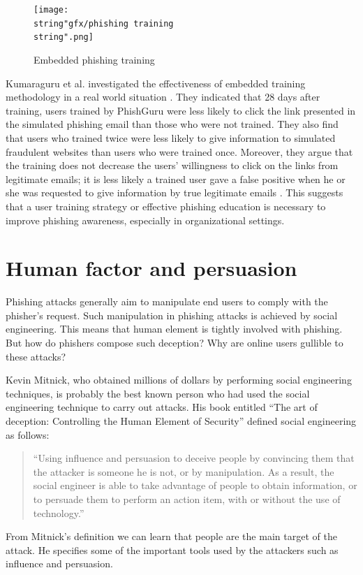 \begin{figure}[H]
\centering{}\texttt{[image: \\string"gfx/phishing training\\string".png]}\protect\caption{\label{fig:em-training}Embedded phishing training \citep{kumaraguru:2009}}
\end{figure}


Kumaraguru et al. investigated the effectiveness of embedded training
methodology in a real world situation \citep{kumaraguru:2009}. They
indicated that 28 days after training, users trained by PhishGuru
were less likely to click the link presented in the simulated phishing
email than those who were not trained. They also find that users who
trained twice were less likely to give information to simulated fraudulent
websites than users who were trained once. Moreover, they argue that
the training does not decrease the users' willingness to click on
the links from legitimate emails; it is less likely a trained user
gave a false positive when he or she was requested to give information
by true legitimate emails \citep{kumaraguru:2009}. This suggests
that a user training strategy or effective phishing education is necessary
to improve phishing awareness, especially in organizational settings.


\section{\label{sec:Human-factor-and}Human factor and persuasion}

Phishing attacks generally aim to manipulate end users to comply with
the phisher's request. Such manipulation in phishing attacks is achieved
by social engineering. This means that human element is tightly involved
with phishing. But how do phishers compose such deception? Why are
online users gullible to these attacks? 

Kevin Mitnick, who obtained millions of dollars by performing social
engineering techniques, is probably the best known person who had
used the social engineering technique to carry out attacks. His book
entitled ``The art of deception: Controlling the Human Element of
Security'' \citep{mitnik:2001} defined social engineering as follows:
\begin{quote}
``Using influence and persuasion to deceive people by convincing
them that the attacker is someone he is not, or by manipulation. As
a result, the social engineer is able to take advantage of people
to obtain information, or to persuade them to perform an action item,
with or without the use of technology.''
\end{quote}
From Mitnick's definition we can learn that people are the main target
of the attack. He specifies some of the important tools used by the
attackers such as influence and persuasion.

